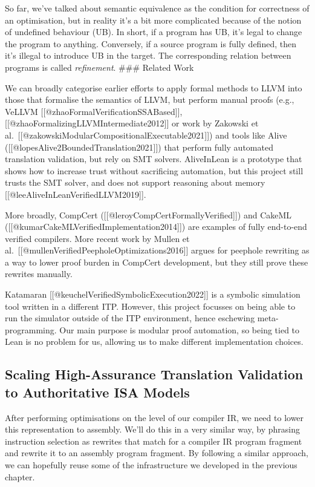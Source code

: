 So far, we've talked about semantic equivalence as the condition for
correctness of an optimisation, but in reality it's a bit more
complicated because of the notion of undefined behaviour (UB). In short,
if a program has UB, it's legal to change the program to anything.
Conversely, if a source program is fully defined, then it's illegal to
introduce UB in the target. The corresponding relation between programs
is called \emph{refinement}. \#\#\# Related Work

We can broadly categorise earlier efforts to apply formal methods to
LLVM into those that formalise the semantics of LLVM, but perform manual
proofs (e.g., VeLLVM {[}{[}@zhaoFormalVerificationSSABased{]}{]},
{[}{[}@zhaoFormalizingLLVMIntermediate2012{]}{]} or work by Zakowski et
al.~{[}{[}@zakowskiModularCompositionalExecutable2021{]}{]}) and tools
like Alive ({[}{[}@lopesAlive2BoundedTranslation2021{]}{]}) that perform
fully automated translation validation, but rely on SMT solvers.
AliveInLean is a prototype that shows how to increase trust without
sacrificing automation, but this project still trusts the SMT solver,
and does not support reasoning about memory
{[}{[}@leeAliveInLeanVerifiedLLVM2019{]}{]}.

More broadly, CompCert ({[}{[}@leroyCompCertFormallyVerified{]}{]}) and
CakeML ({[}{[}@kumarCakeMLVerifiedImplementation2014{]}{]}) are examples
of fully end-to-end verified compilers. More recent work by Mullen et
al.~{[}{[}@mullenVerifiedPeepholeOptimizations2016{]}{]} argues for
peephole rewriting as a way to lower proof burden in CompCert
development, but they still prove these rewrites manually.

Katamaran {[}{[}@keuchelVerifiedSymbolicExecution2022{]}{]} is a
symbolic simulation tool written in a different ITP. However, this
project focusses on being able to run the simulator outside of the ITP
environment, hence eschewing meta-programming. Our main purpose is
modular proof automation, so being tied to Lean is no problem for us,
allowing us to make different implementation choices.

\subsection{Scaling High-Assurance Translation Validation to
Authoritative ISA
Models}\label{scaling-high-assurance-translation-validation-to-authoritative-isa-models}

After performing optimisations on the level of our compiler IR, we need
to lower this representation to assembly. We'll do this in a very
similar way, by phrasing instruction selection as rewrites that match
for a compiler IR program fragment and rewrite it to an assembly program
fragment. By following a similar approach, we can hopefully reuse some
of the infrastructure we developed in the previous chapter.


